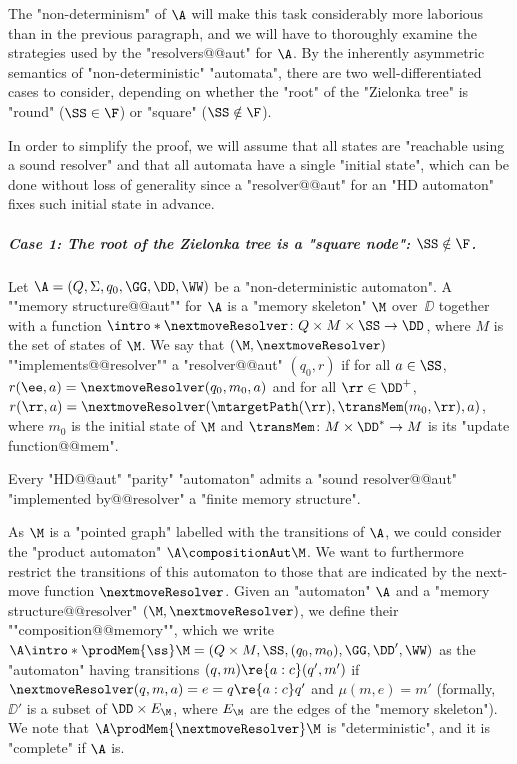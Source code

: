 \documentclass{theoretics}
\begin{document}
The "non-determinism" of $\A$ will make this task considerably more laborious than in the previous paragraph, and we will have to thoroughly examine the strategies used by the "resolvers@@aut" for $\A$.
By the inherently asymmetric semantics of "non-deterministic" "automata", there are two well-differentiated cases to consider, depending on whether the "root" of the "Zielonka tree" is "round" ($\SS\in \F$) or "square" ($\SS\notin \F$).


In order to simplify the proof, we will assume that all states are "reachable using a sound resolver" and that all automata have a single "initial state", which can be done without loss of generality since a "resolver@@aut" for an "HD automaton" fixes such initial state in advance.

\subparagraph*{Case 1: The root of the Zielonka tree is a "square node": $\SS\notin \F$.}

\AP Let $\A = (Q,\Sigma, q_0, \GG, \DD, \WW)$ be a "non-deterministic automaton". A ""memory structure@@aut"" for $\A$ is a "memory skeleton" $\M$ over~$\DD$ together with a function $\intro*\nextmoveResolver\colon Q\times M \times \SS \to \DD$, where $M$ is the set of states of $\M$.
\AP We say that $(\M, \nextmoveResolver)$ ""implements@@resolver"" a "resolver@@aut" $(q_0,r)$ if  for all $a\in \SS$, $r(\ee,a) = \nextmoveResolver(q_0,m_0,a)$ and for all $\rr\in \DD^+$, $r(\rr,a) = \nextmoveResolver(\mtargetPath(\rr), \transMem(m_0, \rr), a)$, where $m_0$ is the initial state of $\M$ and $\transMem\colon M\times \DD^*\to M$ is its "update function@@mem".


\begin{lemma}\label{lemma-ZT:finite-memory-resolvers}
	Every "HD@@aut" "parity" "automaton" admits a "sound resolver@@aut" "implemented by@@resolver" a "finite memory structure".
\end{lemma}

As $\M$ is a "pointed graph" labelled with the transitions of $\A$, we could consider the "product automaton" $\A\compositionAut \M$. We want to furthermore restrict the transitions of this automaton to those that are indicated by the next-move function $\nextmoveResolver$.
\AP Given an "automaton" $\A$ and a "memory structure@@resolver" $(\M, \nextmoveResolver)$, we define their ""composition@@memory"", which we write $\A \intro*\prodMem{\ss} \M = (Q\times M, \SS, (q_0,m_0), \GG, \DD', \WW)$ as the "automaton" having transitions $(q,m) \re{a:c} (q',m')$ if $\nextmoveResolver(q,m,a) = e = q\re{a:c} q'$ and $\mu(m,e) = m'$ (formally, $\DD'$ is a subset of $\DD\times E_\M$, where $E_\M$ are the edges of the "memory skeleton"). We note that $\A \prodMem{\nextmoveResolver} \M$ is "deterministic", and it is "complete" if $\A$ is.
\end{document}
